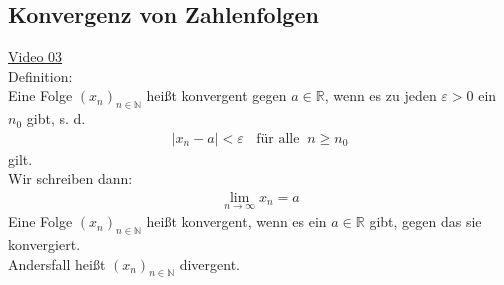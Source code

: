 \subsection{Konvergenz von Zahlenfolgen }
\href{https://youtu.be/KBmVpgrY57o}{Video 03}\\
Definition:\\
Eine Folge $ (x_n)_{n\in \mathbb{N}} $ heißt konvergent gegen $ a\in\mathbb{R} $, wenn es zu jeden $ \varepsilon>0 $ ein $ n_0 $ gibt, s. d.\\
\begin{align*}
\boxed{
	|x_n-a|<\varepsilon \;\; \text{ für alle}\;\; n\geq n_0}
\end{align*}
gilt.\vspace*{2mm}\\
Wir schreiben dann:\\
\begin{align*}
\boxed{\lim\limits_ {n\to\infty}x_n=a}
\end{align*}
Eine Folge $ (x_n)_{n\in \mathbb{N}} $ heißt konvergent, wenn es ein $ a\in\mathbb{R} $ gibt, gegen das sie konvergiert.\\
Andersfall heißt $ (x_n)_{n\in \mathbb{N}} $ divergent.\\
